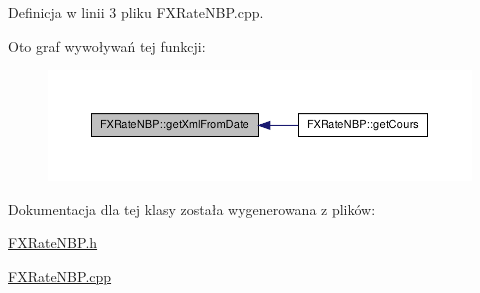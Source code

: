 \-Definicja w linii 3 pliku \-F\-X\-Rate\-N\-B\-P.\-cpp.



\-Oto graf wywoływań tej funkcji\-:\nopagebreak
\begin{figure}[H]
\begin{center}
\leavevmode
\includegraphics[width=350pt]{class_f_x_rate_n_b_p_a882f90197f0306fdf3e911eb925d7474_icgraph}
\end{center}
\end{figure}




\-Dokumentacja dla tej klasy została wygenerowana z plików\-:\begin{DoxyCompactItemize}
\item 
\hyperlink{_f_x_rate_n_b_p_8h}{\-F\-X\-Rate\-N\-B\-P.\-h}\item 
\hyperlink{_f_x_rate_n_b_p_8cpp}{\-F\-X\-Rate\-N\-B\-P.\-cpp}\end{DoxyCompactItemize}
